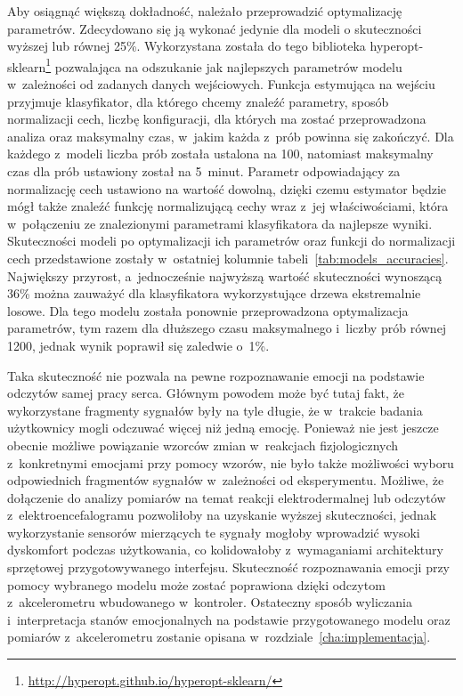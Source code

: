 Aby osiągnąć większą dokładność, należało przeprowadzić optymalizację parametrów. Zdecydowano się ją wykonać jedynie dla modeli o skuteczności wyższej lub równej 25\%. Wykorzystana została do tego biblioteka hyperopt-sklearn\footnote{\url{http://hyperopt.github.io/hyperopt-sklearn/}} pozwalająca na odszukanie jak najlepszych parametrów modelu w~zależności od zadanych danych wejściowych. Funkcja estymująca na wejściu przyjmuje klasyfikator, dla którego chcemy znaleźć parametry, sposób normalizacji cech, liczbę konfiguracji, dla których ma zostać przeprowadzona analiza oraz maksymalny czas, w~jakim każda z~prób powinna się zakończyć. Dla każdego z~modeli liczba prób została ustalona na 100, natomiast maksymalny czas dla prób ustawiony został na 5~minut. Parametr odpowiadający za normalizację cech ustawiono na wartość dowolną, dzięki czemu estymator będzie mógł także znaleźć funkcję normalizującą cechy wraz z~jej właściwościami, która w~połączeniu ze znalezionymi parametrami klasyfikatora da najlepsze wyniki. Skuteczności modeli po optymalizacji ich parametrów oraz funkcji do normalizacji cech przedstawione zostały w~ostatniej kolumnie tabeli~\ref{tab:models_accuracies}. Największy przyrost, a~jednocześnie najwyższą wartość skuteczności wynoszącą 36\% można zauważyć dla klasyfikatora wykorzystujące drzewa ekstremalnie losowe. Dla tego modelu została ponownie przeprowadzona optymalizacja parametrów, tym razem dla dłuższego czasu maksymalnego i~liczby prób równej 1200, jednak wynik poprawił się zaledwie o~1\%. 

Taka skuteczność nie pozwala na pewne rozpoznawanie emocji na podstawie odczytów samej pracy serca. Głównym powodem może być tutaj fakt, że wykorzystane fragmenty sygnałów były na tyle długie, że w~trakcie badania użytkownicy mogli odczuwać więcej niż jedną emocję. Ponieważ nie jest jeszcze obecnie możliwe powiązanie wzorców zmian w~reakcjach fizjologicznych z~konkretnymi emocjami przy pomocy wzorów, nie było także możliwości wyboru odpowiednich fragmentów sygnałów w~zależności od eksperymentu. Możliwe, że dołączenie do analizy pomiarów na temat reakcji elektrodermalnej lub odczytów z~elektroencefalogramu pozwoliłoby na uzyskanie wyższej skuteczności, jednak wykorzystanie sensorów mierzących te sygnały mogłoby wprowadzić wysoki dyskomfort podczas użytkowania, co kolidowałoby z~wymaganiami architektury sprzętowej przygotowywanego interfejsu. Skuteczność rozpoznawania emocji przy pomocy wybranego modelu może zostać poprawiona dzięki odczytom z~akcelerometru wbudowanego w~kontroler. Ostateczny sposób wyliczania i~interpretacja stanów emocjonalnych na podstawie przygotowanego modelu oraz pomiarów z~akcelerometru zostanie opisana w~rozdziale~\ref{cha:implementacja}.